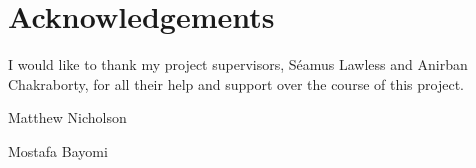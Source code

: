 \chapter*{\Huge{Acknowledgements}}

I would like to thank my project supervisors, Séamus Lawless and Anirban Chakraborty, for all their help and support over the course of this project. 


Matthew Nicholson

Mostafa Bayomi